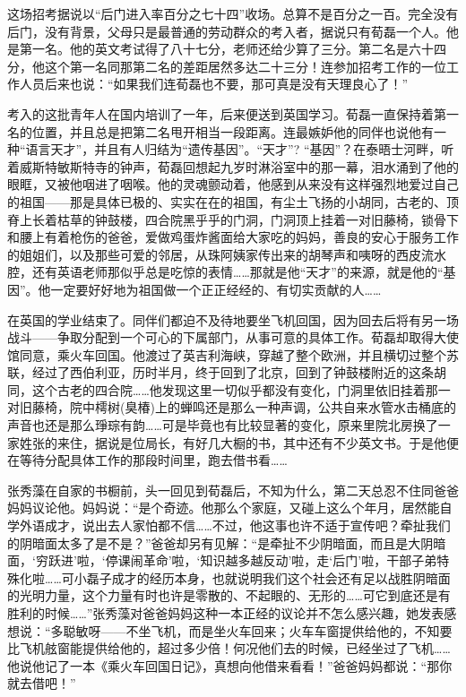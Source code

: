 \par 这场招考据说以“后门进入率百分之七十四”收场。总算不是百分之一百。完全没有后门，没有背景，父母只是最普通的劳动群众的考入者，据说只有荀磊一个人。他是第一名。他的英文考试得了八十七分，老师还给少算了三分。第二名是六十四分，他这个第一名同那第二名的差距居然多达二十三分！连参加招考工作的一位工作人员后来也说：“如果我们连荀磊也不要，那可真是没有天理良心了！”
\par 考入的这批青年人在国内培训了一年，后来便送到英国学习。荀磊一直保持着第一名的位置，并且总是把第二名甩开相当一段距离。连最嫉妒他的同伴也说他有一种“语言天才”，并且有人归结为“遗传基因”。“天才”? “基因”？在泰晤士河畔，听着威斯特敏斯特寺的钟声，荀磊回想起九岁时淋浴室中的那一幕，泪水涌到了他的眼眶，又被他咽进了咽喉。他的灵魂颤动着，他感到从来没有这样强烈地爱过自己的祖国——那是具体已极的、实实在在的祖国，有尘土飞扬的小胡同，古老的、顶脊上长着枯草的钟鼓楼，四合院黑乎乎的门洞，门洞顶上挂着一对旧藤椅，锁骨下和腰上有着枪伤的爸爸，爱做鸡蛋炸酱面给大家吃的妈妈，善良的安心于服务工作的姐姐们，以及那些可爱的邻居，从珠阿姨家传出来的胡琴声和咦呀的西皮流水腔，还有英语老师那似乎总是吃惊的表情……那就是他“天才”的来源，就是他的“基因”。他一定要好好地为祖国做一个正正经经的、有切实贡献的人……
\par 在英国的学业结束了。同伴们都迫不及待地要坐飞机回国，因为回去后将有另一场战斗——争取分配到一个可心的下属部门，从事可意的具体工作。荀磊却取得大使馆同意，乘火车回国。他渡过了英吉利海峡，穿越了整个欧洲，并且横切过整个苏联，经过了西伯利亚，历时半月，终于回到了北京，回到了钟鼓楼附近的这条胡同，这个古老的四合院……他发现这里一切似乎都没有变化，门洞里依旧挂着那一对旧藤椅，院中樗树(臭椿)上的蝉鸣还是那么一种声调，公共自来水管水击桶底的声音也还是那么琤琮有韵……可是毕竟也有比较显著的变化，原来里院北房换了一家姓张的来住，据说是位局长，有好几大橱的书，其中还有不少英文书。于是他便在等待分配具体工作的那段时间里，跑去借书看……
\par 张秀藻在自家的书橱前，头一回见到荀磊后，不知为什么，第二天总忍不住同爸爸妈妈议论他。妈妈说：“是个奇迹。他那么个家庭，又碰上这么个年月，居然能自学外语成才，说出去人家怕都不信……不过，他这事也许不适于宣传吧？牵扯我们的阴暗面太多了是不是？”爸爸却另有见解：“是牵扯不少阴暗面，而且是大阴暗面，‘穷跃进’啦，‘停课闹革命’啦，‘知识越多越反动’啦，走‘后门’啦，干部子弟特殊化啦……可小磊子成才的经历本身，也就说明我们这个社会还有足以战胜阴暗面的光明力量，这个力量有时也许是零散的、不起眼的、无形的……可它到底还是有胜利的时候……”张秀藻对爸爸妈妈这种一本正经的议论并不怎么感兴趣，她发表感想说：“多聪敏呀——不坐飞机，而是坐火车回来；火车车窗提供给他的，不知要比飞机舷窗能提供给他的，超过多少倍！何况他们去的时候，已经坐过了飞机……他说他记了一本《乘火车回国日记》，真想向他借来看看！”爸爸妈妈都说：“那你就去借吧！”
